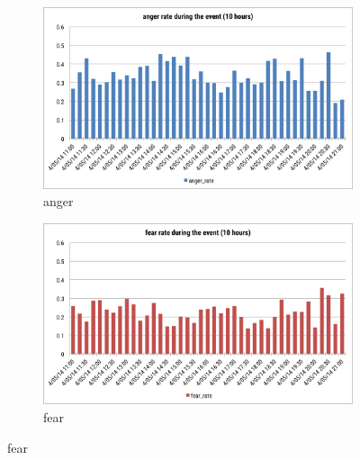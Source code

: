 \clearpage
\begin{figure}[htb!] 
\centering    
\begin{subfigure}{0.5\textwidth}
\centering
\includegraphics[width=0.99\linewidth]{AngerRateEvent}
\caption{anger}
\label{fig:angerRateEvent}
\end{subfigure}%
\begin{subfigure}{0.5\textwidth}
\centering    
\includegraphics[width=0.99\linewidth]{FearRateEvent}
\caption{fear}
\label{fig:fearRateEvent}
\end{subfigure}


\end{figure}
